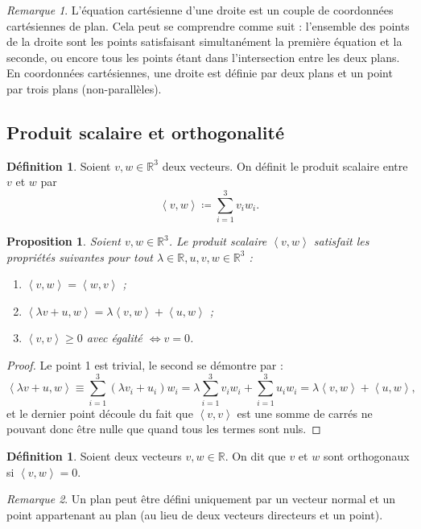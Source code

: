 \documentclass{article}
\newcommand{\R}{\mathbb R}
\newcommand{\scpr}[2]{\left\langle #1, #2\right\rangle}
\newtheorem{prp}[thm]{Proposition}
\theoremstyle{definition}
\newtheorem{déf}[thm]{Définition}
\theoremstyle{remark}
\newtheorem*{rmq}{Remarque}
\begin{document}
		\begin{rmq} L'équation cartésienne d'une droite est un couple de coordonnées cartésiennes de plan. Cela peut se comprendre comme suit : l'ensemble des points de
		la droite sont les points satisfaisant simultanément la première équation et la seconde, ou encore tous les points étant dans l'intersection entre les deux plans.
		En coordonnées cartésiennes, une droite est définie par deux plans et un point par trois plans (non-parallèles). \end{rmq}
	
	\subsection{Produit scalaire et orthogonalité}
		\begin{déf} Soient $v, w \in \R^3$ deux vecteurs. On définit le produit scalaire entre $v$ et $w$ par \[\scpr vw \coloneqq \sum_{i=1}^3v_iw_i.\] \end{déf}

		\begin{prp} Soient $v, w \in \R^3$. Le produit scalaire $\scpr vw$ satisfait les propriétés suivantes pour tout $\lambda \in \R, u, v ,w \in \R^3$ :
		\begin{enumerate}
			\item $\scpr vw = \scpr wv$ ;
			\item $\scpr {\lambda v+u}w = \lambda \scpr vw + \scpr uw$ ;
			\item $\scpr vv \geq 0$ avec égalité $\iff v = 0$.
		\end{enumerate}
		\end{prp}

		\begin{proof} Le point 1 est trivial, le second se démontre par :
		\[\scpr {\lambda v+u}w \equiv \sum_{i=1}^3(\lambda v_i + u_i)w_i = \lambda \sum_{i=1}^3v_iw_i + \sum_{i=1}^3u_iw_i = \lambda \scpr vw + \scpr uw,\]
		et le dernier point découle du fait que $\scpr vv$ est une somme de carrés ne pouvant donc être nulle que quand tous les termes sont nuls. \end{proof}

		\begin{déf} Soient deux vecteurs $v, w \in \R$. On dit que $v$ et $w$ sont orthogonaux si $\scpr vw = 0$. \end{déf}

		\begin{rmq} Un plan peut être défini uniquement par un vecteur normal et un point appartenant au plan (au lieu de deux vecteurs directeurs et un point). \end{rmq}
\end{document}
